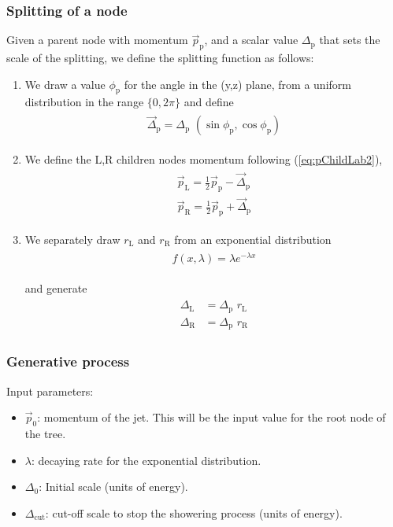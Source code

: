 \documentclass[12pt]{article}
\newcommand{\bea}{\begin{eqnarray}\begin{aligned}}
\newcommand{\eea}{\end{aligned}\end{eqnarray}}
\begin{document}
\subsubsection{Splitting of a node}

Given a parent node with momentum $\vec{p}_\text{p}$, and a scalar value $\Delta_{\text{p}}$ that sets the scale of the splitting, we define the splitting function as follows:
\begin{enumerate}

\item We draw a value $\phi_\text{p}$ for the angle in the (y,z) plane, from a uniform distribution in the range $\{0,2\pi\}$ and define
\bea\label{eq:Deltavec}
\vec{\Delta}_\text{p}= \Delta_\text{p}\,\,(\sin\phi_\text{p},\cos\phi_\text{p})
\eea 

\item We define the L,R children nodes momentum following (\ref{eq:pChildLab2}),
\bea\label{eq:pLR}
\vec{p}_\text{L}= \frac{1}{2} \vec{p}_\text{p} - \vec{\Delta}_\text{p}  \\
\vec{p}_\text{R}= \frac{1}{2} \vec{p}_\text{p} +\vec{\Delta}_\text{p}
\eea

\item We separately draw $r_\text{L}$ and $r_\text{R}$ from an exponential distribution 
\bea \label{eq:exponential}
f(x,\lambda)=\lambda e^{-\lambda x} 
\eea

and generate
\bea
\Delta_\text{L} &= \Delta_\text{p} \,\, r_\text{L}\\
\Delta_\text{R} &= \Delta_\text{p} \,\, r_\text{R}
\eea

\end{enumerate}

\subsubsection{Generative process}

Input parameters:
\begin{itemize}

\item $\vec{p}_0$: momentum of the jet. This will be the input value for the root node of the tree.
\item $\lambda$: decaying rate for the exponential distribution.
\item $\Delta_0$: Initial scale (units of energy). 
\item $\Delta_\text{cut}$: cut-off scale to stop the showering process (units of energy). 

\end{itemize}
\end{document}
